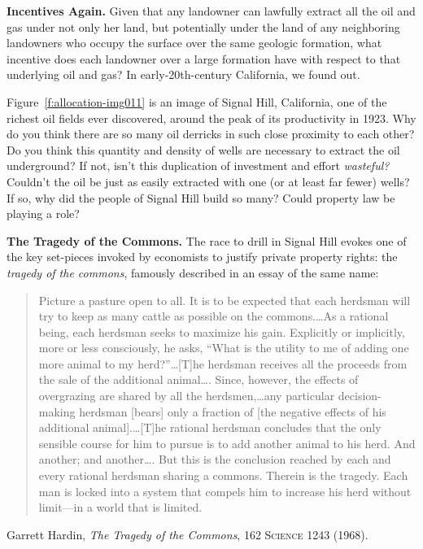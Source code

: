 \item \textbf{Incentives Again.} Given that any landowner can lawfully extract
all the oil and gas under not only her land, but potentially under the land of
any neighboring landowners who occupy the surface over the same geologic
formation, what incentive does each landowner over a large formation have with
respect to that underlying oil and gas? In early-20th-century California, we
found out.


Figure~\ref{f:allocation-img011} is an image of Signal Hill, California, one of
the richest oil fields ever
discovered, around the peak of its productivity in 1923. Why do you think there
are so many oil derricks in such close proximity to each other? Do you think
this quantity and density of wells are necessary to extract the oil underground?
If not, isn't this duplication of investment and effort \textit{wasteful?}
Couldn't the oil be just as easily extracted with one (or at least far fewer)
wells? If so, why did the people of Signal Hill build so many? Could property
law be playing a role?


\item \textbf{The Tragedy of the Commons.} The race to drill in Signal Hill
evokes one of the key set-pieces invoked by economists to justify private
property rights: the \textit{tragedy of the commons}, famously described in an
essay of the same name:
\begin{quote}
Picture a pasture open to all. It is to be expected that each herdsman will
try to keep as many cattle as possible on the commons.\ldots As a rational
being, each herdsman seeks to maximize his gain. Explicitly or implicitly, more
or less consciously, he asks, ``What is the utility to me of adding one more
animal to my herd?''\ldots [T]he herdsman receives all the proceeds from the
sale of the additional animal\ldots . Since, however, the effects of overgrazing
are shared by all the herdsmen,\ldots any particular decision-making herdsman
[bears] only a fraction of [the negative effects of his additional
animal].\ldots [T]he rational herdsman concludes that the only sensible course
for him to pursue is to add another animal to his herd. And another; and
another\ldots. But this is the conclusion reached by each and every rational
herdsman sharing a commons. Therein is the tragedy. Each man is locked into a
system that compels him to increase his herd without limit---in a world that is
limited.
\end{quote}
Garrett Hardin, \textit{The Tragedy of the Commons}, 162 \textsc{Science} 1243
(1968). 

